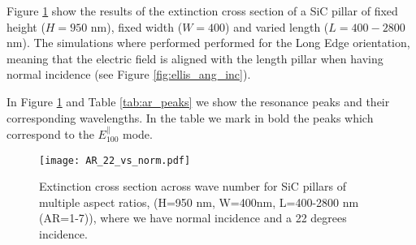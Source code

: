 Figure \ref{fig:AR_22_vs_norm} show the results of the extinction cross section of a SiC pillar of fixed
height ($H=950$ nm), fixed width ($W=400$) and varied length ($L=400-2800$ nm). The simulations where performed 
performed for the Long Edge orientation, meaning that the electric field is aligned with the length pillar 
when having normal incidence (see Figure \ref{fig:ellis_ang_inc}). 

In Figure \ref{fig:AR_22_vs_norm} and Table \ref{tab:ar_peaks} we show the resonance peaks and
their corresponding wavelengths. In the table we mark in bold the peaks which correspond to 
the $E^{\parallel}_{100}$ mode. 

\begin{figure}
    \centering
    \texttt{[image: AR\_22\_vs\_norm.pdf]} 
    \caption{Extinction cross section across wave number for SiC pillars of multiple aspect ratios,  
             (H=950 nm, W=400nm, L=400-2800 nm (AR=1-7)), where we have normal incidence and a 
             22 degrees incidence.
            }
    \label{fig:AR_22_vs_norm}
 \end{figure}


